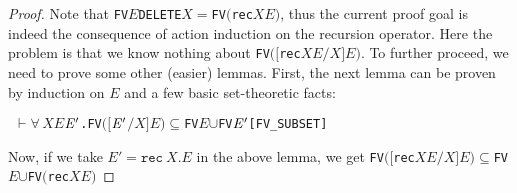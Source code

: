 \documentclass[GCNS]{yincog}
\renewcommand{\HOLinline}[1]{\mbox{\textup{\texttt{#1}}}}
\renewcommand{\HOLConst}[1]{\texttt{#1}}
\renewcommand{\HOLBoundVar}[1]{\ensuremath{\mathit{#1}}}
\renewcommand{\HOLFreeVar}[1]{\ensuremath{\mathit{#1}}}
\renewcommand{\HOLSymConst}[1]{#1}
\renewcommand{\HOLTokenSubset}{\ensuremath{\subseteq}}
\renewcommand{\HOLTokenUnion}{\ensuremath{\cup}}
\renewcommand{\HOLTokenForall}{\ensuremath{\forall \,}}
\renewcommand{\HOLTokenTurnstile}{\ensuremath{\:\:\vdash}}
\theoremstyle{remark}
\theoremstyle{theorem}
\theoremstyle{remark}
\newcommand{\recu}[2]{\mathtt{rec}\: #1 . #2}
\begin{document}
\begin{proof}
\begin{alltt}
\end{alltt}
%
Note that
\HOLinline{\HOLConst{FV}\\\;\HOLFreeVar{E}\\\;\HOLConst{DELETE}\\\;\HOLFreeVar{X}\\\;\HOLSymConst{\ensuremath{=}}\\\;\HOLConst{FV}\\\;\ensuremath{(}\HOLConst{rec}\\\;\HOLFreeVar{X}\\\;\HOLFreeVar{E}\ensuremath{)}},
thus the current proof goal is indeed the consequence of action induction
on the recursion operator. Here the problem is that we know nothing about
\HOLinline{\HOLConst{FV}\\\;\ensuremath{(}\ensuremath{[}\HOLConst{rec}\\\;\HOLFreeVar{X}\\\;\HOLFreeVar{E}\ensuremath{/}\HOLFreeVar{X}\ensuremath{]}\\\;\HOLFreeVar{E}\ensuremath{)}}.
To further proceed, we need to prove some other (easier) lemmas. First,
the next lemma can be proven by induction on $E$ and a few basic set-theoretic
facts:
%
\begin{alltt}
\HOLTokenTurnstile{} \HOLSymConst{\HOLTokenForall{}}\HOLBoundVar{X} \HOLBoundVar{E} \ensuremath{\HOLBoundVar{E}\sp{\prime}}. \HOLConst{FV} \ensuremath{(}\ensuremath{[}\ensuremath{\HOLBoundVar{E}\sp{\prime}}\ensuremath{/}\HOLBoundVar{X}\ensuremath{]} \HOLBoundVar{E}\ensuremath{)} \HOLSymConst{\HOLTokenSubset{}} \HOLConst{FV} \HOLBoundVar{E} \HOLSymConst{\HOLTokenUnion{}} \HOLConst{FV} \ensuremath{\HOLBoundVar{E}\sp{\prime}}\hfill{[FV\_SUBSET]}
\end{alltt}
%
Now, if we take $E' = \recu X E$ in the above lemma, we get
\HOLinline{\HOLConst{FV}\\\;\ensuremath{(}\ensuremath{[}\HOLConst{rec}\\\;\HOLFreeVar{X}\\\;\HOLFreeVar{E}\ensuremath{/}\HOLFreeVar{X}\ensuremath{]}\\\;\HOLFreeVar{E}\ensuremath{)}\\\;\HOLSymConst{\HOLTokenSubset{}}\\\;\HOLConst{FV}\\\;\HOLFreeVar{E}\\\;\HOLSymConst{\HOLTokenUnion{}}\\\;\HOLConst{FV}\\\;\ensuremath{(}\HOLConst{rec}\\\;\HOLFreeVar{X}\\\;\HOLFreeVar{E}\ensuremath{)}}

\end{proof}
\end{document}
